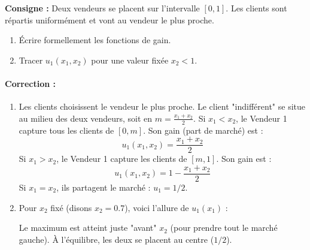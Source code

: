 \begin{exemple}
\textbf{Consigne :} Deux vendeurs se placent sur l'intervalle $[0, 1]$. Les clients sont répartis uniformément et vont au vendeur le plus proche.
\begin{enumerate}
    \item Écrire formellement les fonctions de gain.
    \item Tracer $u_1(x_1, x_2)$ pour une valeur fixée $x_2 < 1$.
\end{enumerate}

\paragraph{Correction :}
\begin{enumerate}
    \item Les clients choisissent le vendeur le plus proche. Le client "indifférent" se situe au milieu des deux vendeurs, soit en $m = \frac{x_1 + x_2}{2}$.
   Si $x_1 < x_2$, le Vendeur 1 capture tous les clients de $[0, m]$. Son gain (part de marché) est :
   $$u_1(x_1, x_2) = \frac{x_1 + x_2}{2}$$
   Si $x_1 > x_2$, le Vendeur 1 capture les clients de $[m, 1]$. Son gain est :
   $$u_1(x_1, x_2) = 1 - \frac{x_1 + x_2}{2}$$
   Si $x_1 = x_2$, ils partagent le marché : $u_1 = 1/2$.

    \item Pour $x_2$ fixé (disons $x_2 = 0.7$), voici l'allure de $u_1(x_1)$ :
\begin{center}
\end{center}
Le maximum est atteint juste "avant" $x_2$ (pour prendre tout le marché gauche). À l'équilibre, les deux se placent au centre ($1/2$).
\end{enumerate}
\end{exemple}
